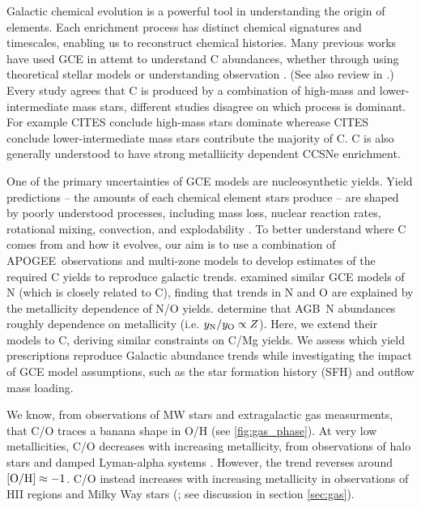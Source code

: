 \documentclass[fleqn,usenatbib]{mnras}
\newcommand{\agb}{AGB}
\newcommand{\apogee}{APOGEE}
\newcommand{\gce}{GCE}
\newcommand{\sfh}{SFH} %
\newcommand{\lims}{lower-intermediate mass stars}
\newcommand{\hms}{high-mass stars}
\begin{document}


Galactic chemical evolution is a powerful tool in understanding the origin of elements. 
Each enrichment process has distinct chemical signatures and timescales, enabling us to reconstruct chemical histories.
Many previous works have used GCE in attemt to understand C abundances, whether through using theoretical stellar models \citep{DTS78, prantzos+18, chiappini+03} 
or understanding  observation \citep{tinsley79, HEK00, BF06, rybizki+17, berg+19, KKL20}.
(See also review in \citealt{romano22}.)
%
Every study agrees that C is produced by a combination of high-mass and \lims{}, different studies disagree on which process is dominant. 
For example CITES conclude \hms{} dominate wherease CITES conclude \lims{} contribute the majority of C.
C is also generally understood to have strong metalliicity dependent CCSNe enrichment. 


One of the primary uncertainties of GCE models are nucleosynthetic yields. Yield predictions -- the amounts of each chemical element stars produce --
are shaped by poorly understood processes, including mass loss, nuclear reaction rates, rotational mixing, convection, and explodability \citep{romano+10,KL14,ventura+13, LC18, emily+21}.
To better understand where C comes from and how it evolves, our aim is to use a combination of \apogee\ observations and multi-zone models to develop estimates of the required C yields to reproduce galactic trends.
\cite{james+23} examined similar \gce{} models of N (which is closely related to C), finding that trends in N and O\footnotemark{} are explained by the metallicity dependence of N/O yields. \citet{james+23} determine that \agb\ N abundances roughly dependence on metallicity (i.e. $y_{\rm N}/y_{\rm O} \propto Z$). 
Here, we extend their models to C, deriving similar constraints on C/Mg yields. We assess which yield prescriptions reproduce Galactic abundance trends while investigating the impact of \gce{} model assumptions, such as the star formation history (\sfh{}) and outflow mass loading.

 
We know, from observations of MW stars and extragalactic gas measurments, that C/O traces a banana shape in O/H (see \ref{fig:gas_phase}). 
At very low metallicities, C/O decreases with increasing metallicity, from observations of halo stars and damped Lyman-alpha systems\footnotemark{} \citep{nissen+14, cooke+17, fabbian+09}. 
%
However, the trend reverses around $[{\rm O/H}]\approx-1$\footnotemark{}. 
C/O instead increases with increasing metallicity in observations of HII regions and Milky Way stars (\citealt{berg+19}; see discussion in section \ref{sec:gas}).
\end{document}
